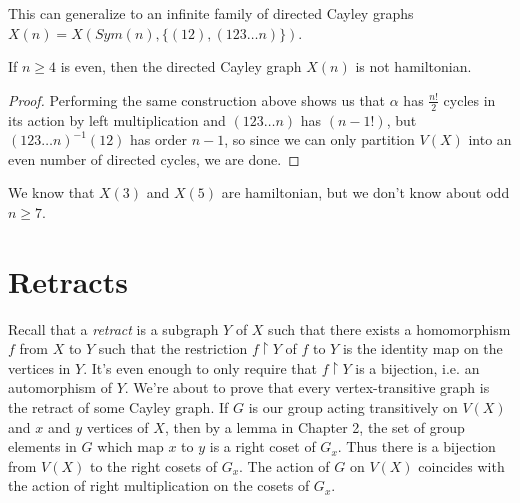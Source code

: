 This can generalize to an infinite family of directed Cayley graphs $X(n)=X(Sym(n),\{(12),(123\dots n)\})$.

\begin{corollary}
	{If $n\geq 4$ is even, then the directed Cayley graph $X(n)$ is not hamiltonian.}
	
\end{corollary}
\begin{proof}
	Performing the same construction above shows us that $\alpha$ has $\frac{n!}{2}$ cycles in its action by left multiplication and $(123\dots n)$ has $(n-1!)$, but $(123\dots n)^{-1}(12)$ has order $n-1$, so since we can only partition $V(X)$ into an even number of directed cycles, we are done.
\end{proof}


We know that $X(3)$ and $X(5)$ are hamiltonian, but we don't know about odd $n\geq 7$.


\section*{Retracts}
Recall that a \textit{retract} is a subgraph $Y$ of $X$ such that there exists a homomorphism $f$ from $X$ to $Y$ such that the restriction  $f\upharpoonright Y$ of $f$ to $Y$ is the identity map on the vertices in $Y$.  It's even enough to only require that $f\upharpoonright Y$ is a bijection, i.e. an automorphism of $Y$.  We're about to prove that every vertex-transitive graph is the retract of some Cayley graph.  If $G$ is our group acting transitively on $V(X)$ and $x$ and $y$ vertices of $X$, then by a lemma in Chapter 2, the set of group elements in $G$ which map $x$ to $y$ is a right coset of $G_x$.  Thus there is a bijection from $V(X)$ to the right cosets of $G_x$.  The action of $G$ on $V(X)$ coincides with the action of right multiplication on the cosets of $G_x$.

